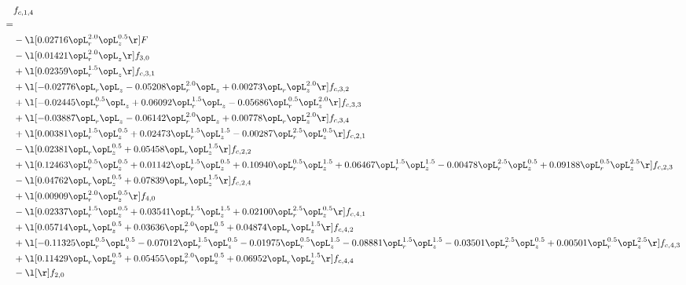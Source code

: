 \begin{alignat}{2} 
\label{eq:f_14_2} 
& f_{c,1,4} \nonumber \\ 
 = \\ 
& - \l[  0.02716 \opL_r^{2.0} \opL_z^{0.5}  \r] F \nonumber \\ 
& - \l[  0.01421 \opL_r^{2.0} \opL_z  \r] f_{3,0} \nonumber \\ 
& + \l[  0.02359 \opL_r^{1.5} \opL_z  \r] f_{c,3,1} \nonumber \\ 
& + \l[  -0.02776 \opL_r \opL_z   -0.05208 \opL_r^{2.0} \opL_z +  0.00273 \opL_r \opL_z^{2.0}  \r] f_{c,3,2} \nonumber \\ 
& + \l[  -0.02445 \opL_r^{0.5} \opL_z +  0.06092 \opL_r^{1.5} \opL_z   -0.05686 \opL_r^{0.5} \opL_z^{2.0}  \r] f_{c,3,3} \nonumber \\ 
& + \l[  -0.03887 \opL_r \opL_z   -0.06142 \opL_r^{2.0} \opL_z +  0.00778 \opL_r \opL_z^{2.0}  \r] f_{c,3,4} \nonumber \\ 
& + \l[  0.00381 \opL_r^{1.5} \opL_z^{0.5} +  0.02473 \opL_r^{1.5} \opL_z^{1.5}   -0.00287 \opL_r^{2.5} \opL_z^{0.5}  \r] f_{c,2,1} \nonumber \\ 
& - \l[  0.02381 \opL_r \opL_z^{0.5} +  0.05458 \opL_r \opL_z^{1.5}  \r] f_{c,2,2} \nonumber \\ 
& + \l[  0.12463 \opL_r^{0.5} \opL_z^{0.5} +  0.01142 \opL_r^{1.5} \opL_z^{0.5} +  0.10940 \opL_r^{0.5} \opL_z^{1.5} +  0.06467 \opL_r^{1.5} \opL_z^{1.5}   -0.00478 \opL_r^{2.5} \opL_z^{0.5} +  0.09188 \opL_r^{0.5} \opL_z^{2.5}  \r] f_{c,2,3} \nonumber \\ 
& - \l[  0.04762 \opL_r \opL_z^{0.5} +  0.07839 \opL_r \opL_z^{1.5}  \r] f_{c,2,4} \nonumber \\ 
& + \l[  0.00909 \opL_r^{2.0} \opL_z^{0.5}  \r] f_{4,0} \nonumber \\ 
& - \l[  0.02337 \opL_r^{1.5} \opL_z^{0.5} +  0.03541 \opL_r^{1.5} \opL_z^{1.5} +  0.02100 \opL_r^{2.5} \opL_z^{0.5}  \r] f_{c,4,1} \nonumber \\ 
& + \l[  0.05714 \opL_r \opL_z^{0.5} +  0.03636 \opL_r^{2.0} \opL_z^{0.5} +  0.04874 \opL_r \opL_z^{1.5}  \r] f_{c,4,2} \nonumber \\ 
& + \l[  -0.11325 \opL_r^{0.5} \opL_z^{0.5}   -0.07012 \opL_r^{1.5} \opL_z^{0.5}   -0.01975 \opL_r^{0.5} \opL_z^{1.5}   -0.08881 \opL_r^{1.5} \opL_z^{1.5}   -0.03501 \opL_r^{2.5} \opL_z^{0.5} +  0.00501 \opL_r^{0.5} \opL_z^{2.5}  \r] f_{c,4,3} \nonumber \\ 
& + \l[  0.11429 \opL_r \opL_z^{0.5} +  0.05455 \opL_r^{2.0} \opL_z^{0.5} +  0.06952 \opL_r \opL_z^{1.5}  \r] f_{c,4,4} \nonumber \\ 
& - \l[  \r] f_{2,0} \nonumber \\ 
\end{alignat} 


